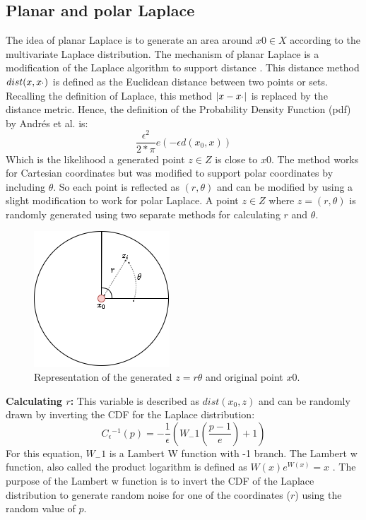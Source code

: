 \subsection{Planar and polar Laplace}
The idea of planar Laplace is to generate an area around $x0 \in X$ according to the multivariate Laplace distribution.
The mechanism of planar Laplace is a modification of the Laplace algorithm to support distance \citep{DBLP:journals/corr/abs-1212-1984}.
This distance method $dist(x, x_`)$ is defined as the Euclidean distance between two points or sets.
Recalling the definition of Laplace, this method $|x-x_`|$ is replaced by the distance metric.
Hence, the definition of the Probability Density Function (pdf) by Andrés et al. is:
\begin{equation}
  \frac{\epsilon^2}{2*\pi}e(-\epsilon d(x_0, x))
\end{equation}
Which is the likelihood a generated point $z \in Z$ is close to $x0$.
The method works for Cartesian coordinates but was modified to support polar coordinates by including $\theta$.
So each point is reflected as $(r, \theta)$ and can be modified by using a slight modification to work for polar Laplace.
A point $z \in Z$ where $z = (r, \theta)$ is randomly generated using two separate methods for calculating $r$ and $\theta$.
\begin{figure}[h]
  \includegraphics[scale=0.6]{TheorethicalFramework/ND-Laplace/Images/polar-laplace.png}
  \centering
  \caption{Representation of the generated $z = {r \theta}$ and original point $x0$.}
  \label{figure:parea}
\end{figure}

\textbf{Calculating $r$:}
This variable is described as $dist(x_0, z)$ and can be randomly drawn by inverting the CDF for the Laplace distribution:
\begin{equation}
  C{_\epsilon}{^{-1}}(p) = - \frac{1}{\epsilon}(W_-1 (\frac{p - 1}{e}) + 1)
\end{equation}
For this equation, $W_-1$ is a Lambert W function with -1 branch.
The Lambert w function, also called the product logarithm is defined as $W(x)e^{W(x)} = x$ \citep{lehtonen_lambert_2016}.
The purpose of the Lambert w function is to invert the CDF of the Laplace distribution to generate random noise for one of the coordinates ($r$) using the random value of $p$.

